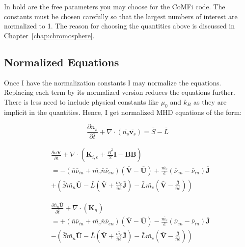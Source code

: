 \documentclass[12pt,upcase]{umlthesis}
\begin{document}
In bold are the free parameters you may choose for the CoMFi code. The constants must be chosen carefully so that the largest numbers of interest are normalized to 1. The reason for choosing the quantities above is discussed in Chapter~\ref{chap:chromosphere}.

\subsection{Normalized Equations}\label{sec:normequations}

Once I have the normalization constants I may normalize the equations. Replacing each term by its normalized version reduces the equations further. There is less need to include physical constants like $\mu_0$ and $k_B$ as they are implicit in the quantities. Hence, I get normalized MHD equations of the form:

\begin{equation}\label{eq:normcontinuity}
	\frac{\partial \bar{n_s}}{\partial \bar{t}} + \nabla \cdot (\bar{n_s} \bar{\textbf{v}_s}) = \bar{S} - \bar{L}
\end{equation}

\begin{equation}\label{eq:normmomentumcom}
\begin{aligned}
	&\frac{\partial \bar{n} \bar{\textbf{V}}}{\partial \bar{t}} + \nabla \cdot (\bar{\textbf{K}}_{i,e} + \frac{\bar{B}^2}{2}\textbf{I} - \bar{\textbf{B}}\bar{\textbf{B}}) \\
	&= - (\bar{n} \bar{\nu}_{in} + \bar{m_e} \bar{n} \bar{\nu}_{en})(\bar{\textbf{V}} - \bar{\textbf{U}}) + \frac{\bar{m_e}}{\bar{e}}(\bar{\nu}_{en}-\bar{\nu}_{in}) \bar{\textbf{J}}  \\
	&+ (\bar{S} \bar{m_n} \bar{\textbf{U}} - \bar{L} (\bar{\textbf{V}}+ \frac{\bar{m_e}}{\bar{n}\bar{e}}\bar{\textbf{J}}) - \bar{L} \bar{m_e} (\bar{\textbf{V}} -\frac{\bar{\textbf{J}}}{\bar{n}\bar{e}}) )
\end{aligned} 
\end{equation}

\begin{equation}\label{eq:normmomentumneutral}
	\begin{aligned}
	&\frac{\partial \bar{n}_n \bar{\textbf{U}}}{\partial \bar{t}} + \nabla \cdot (\bar{\textbf{K}}_n) \\
	&= + (\bar{n} \bar{\nu}_{in} + \bar{m_e} \bar{n} \bar{\nu}_{en})(\bar{\textbf{V}} - \bar{\textbf{U}}) - \frac{\bar{m_e}}{\bar{e}}(\bar{\nu}_{en}-\bar{\nu}_{in}) \bar{\textbf{J}}  \\
	&- (\bar{S} \bar{m_n} \bar{\textbf{U}} - \bar{L} (\bar{\textbf{V}}+ \frac{\bar{m_e}}{\bar{n}\bar{e}}\bar{\textbf{J}}) - \bar{L} \bar{m_e} (\bar{\textbf{V}} -\frac{\bar{\textbf{J}}}{\bar{n}\bar{e}}) )
	\end{aligned}
\end{equation}
\end{document}
